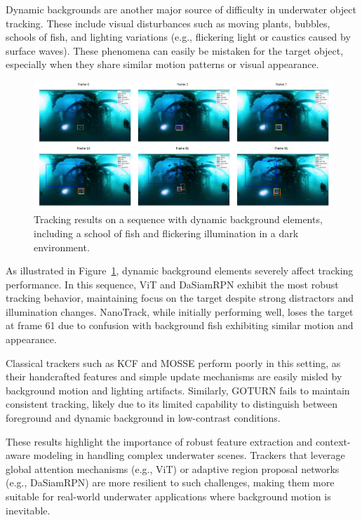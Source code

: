 Dynamic backgrounds are another major source of difficulty in underwater object tracking. These include visual disturbances such as moving plants, bubbles, schools of fish, and lighting variations (e.g., flickering light or caustics caused by surface waves). These phenomena can easily be mistaken for the target object, especially when they share similar motion patterns or visual appearance.

\begin{figure}[ht]
    \centering
    \includegraphics[width=\textwidth]{images/Diving360Degree2 copy.png}
    \caption{Tracking results on a sequence with dynamic background elements, including a school of fish and flickering illumination in a dark environment.}
    \label{fig:dynamic_bg_example}
\end{figure}

As illustrated in Figure~\ref{fig:dynamic_bg_example}, dynamic background elements severely affect tracking performance. In this sequence, ViT and DaSiamRPN exhibit the most robust tracking behavior, maintaining focus on the target despite strong distractors and illumination changes. NanoTrack, while initially performing well, loses the target at frame 61 due to confusion with background fish exhibiting similar motion and appearance.

Classical trackers such as KCF and MOSSE perform poorly in this setting, as their handcrafted features and simple update mechanisms are easily misled by background motion and lighting artifacts. Similarly, GOTURN fails to maintain consistent tracking, likely due to its limited capability to distinguish between foreground and dynamic background in low-contrast conditions.

These results highlight the importance of robust feature extraction and context-aware modeling in handling complex underwater scenes. Trackers that leverage global attention mechanisms (e.g., ViT) or adaptive region proposal networks (e.g., DaSiamRPN) are more resilient to such challenges, making them more suitable for real-world underwater applications where background motion is inevitable.


